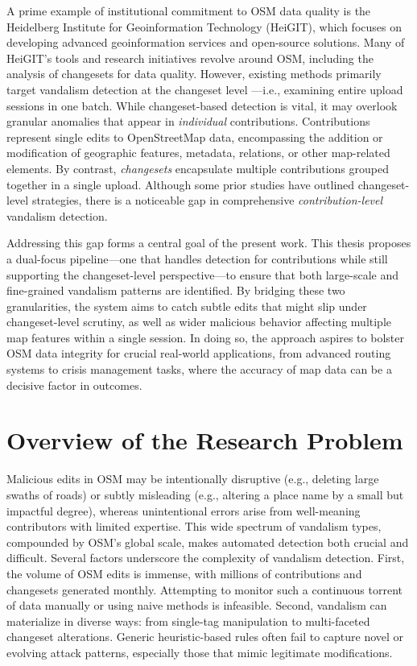 \documentclass[
    13pt, %
    a4paper, %
    twoside, 
    DIV14, %
    listof=totoc, %
    bibliography=totoc, %
    index=totoc, %
    headsepline
]{scrreprt}
\begin{document}
A prime example of institutional commitment to OSM data quality is the Heidelberg Institute for Geoinformation Technology (HeiGIT)\cite{heigit_website}, which focuses on developing advanced geoinformation services and open-source solutions. Many of HeiGIT’s tools and research initiatives revolve around OSM, including the analysis of changesets for data quality. However, existing methods primarily target vandalism detection at the changeset level \cite{Li2021, Yuan2022}—i.e., examining entire upload sessions in one batch. While changeset-based detection is vital, it may overlook granular anomalies that appear in \emph{individual} contributions. Contributions represent single edits to OpenStreetMap data, encompassing the addition or modification of geographic features, metadata, relations, or other map-related elements. By contrast, \emph{changesets} \cite{osm_changesets} encapsulate multiple contributions grouped together in a single upload. Although some prior studies have outlined changeset-level strategies, there is a noticeable gap in comprehensive \emph{contribution-level} vandalism detection.

Addressing this gap forms a central goal of the present work. This thesis proposes a dual-focus pipeline—one that handles detection for contributions while still supporting the changeset-level perspective—to ensure that both large-scale and fine-grained vandalism patterns are identified. By bridging these two granularities, the system aims to catch subtle edits that might slip under changeset-level scrutiny, as well as wider malicious behavior affecting multiple map features within a single session. In doing so, the approach aspires to bolster OSM data integrity for crucial real-world applications, from advanced routing systems to crisis management tasks, where the accuracy of map data can be a decisive factor in outcomes.


\section{Overview of the Research Problem}
\label{sec:overview_problem}

Malicious edits in OSM may be intentionally disruptive (e.g., deleting large swaths of roads) or subtly misleading (e.g., altering a place name by a small but impactful degree), whereas unintentional errors arise from well-meaning contributors with limited expertise. This wide spectrum of vandalism types, compounded by OSM’s global scale, makes automated detection both crucial and difficult. Several factors underscore the complexity of vandalism detection. First, the volume of OSM edits is immense, with millions of contributions and changesets generated monthly. Attempting to monitor such a continuous torrent of data manually or using naive methods is infeasible. Second, vandalism can materialize in diverse ways: from single-tag manipulation to multi-faceted changeset alterations. Generic heuristic-based rules often fail to capture novel or evolving attack patterns, especially those that mimic legitimate modifications.
\end{document}

